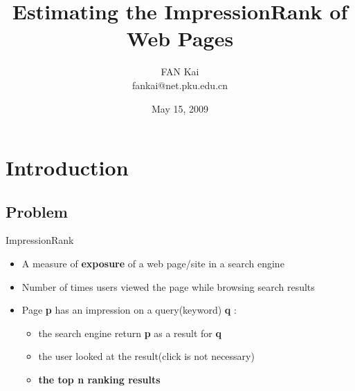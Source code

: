 \documentclass{beamer}
\newcommand{\page}{\textbf{p} }
\newcommand{\query}{\textbf{q} }
\begin{document}
\title{Estimating the ImpressionRank of Web Pages}
\author{FAN Kai \\ fankai@net.pku.edu.cn}
\date{May 15, 2009}

\begin{frame}
    \titlepage
\end{frame}

\section{Introduction}
    \subsection{Problem}

    \begin{frame}{ImpressionRank}
        \begin{itemize}
        \item A measure of \textbf{exposure} of a web page/site in a search engine
        \item Number of times users viewed the page while browsing search results
        \item Page \page has an impression on a query(keyword) \query:
            \begin{itemize}
            \item the search engine return \page as a result for \query
            \item the user looked at the result(click is not necessary)
            \item \textbf{the top n ranking results}
            \end{itemize}
        \end{itemize}
    \end{frame}
\end{document}
